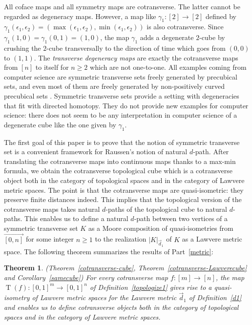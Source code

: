 \documentclass[a4paper,12pt]{amsart}
\renewcommand{\vec}{\overrightarrow}
\newtheorem*{thmN}{Theorem}
\theoremstyle{definition}
\renewcommand{\geq}{\geqslant}
\newcommand{\vd}{\vec{d}\!_1}
\DeclareMathOperator{\TT}{T}
\begin{document}
All coface maps and all symmetry maps are cotransverse. The latter cannot be regarded as degeneracy maps. However, a map like $\gamma_1:[2] \rightarrow [2]$ defined by $\gamma_1(\epsilon_1,\epsilon_2) = (\max(\epsilon_1,\epsilon_2),\min(\epsilon_1,\epsilon_2))$ is also cotransverse. Since $\gamma_1(1,0) = \gamma_1(0,1) = (1,0)$, the map $\gamma_1$ adds a degenerate $2$-cube by crushing the $2$-cube transversally to the direction of time which goes from $(0,0)$ to $(1,1)$. The \textit{transverse degeneracy maps} are exactly the cotransverse maps from $[n]$ to itself for $n\geq 2$ which are not one-to-one. All examples coming from computer science are symmetric transverse sets freely generated by precubical sets, and even most of them are freely generated by non-positively curved precubical sets \cite[Proposition~1.29]{zbMATH07226006}. Symmetric transverse sets provide a setting with degeneracies that fit with directed homotopy. They do not provide new examples for computer science: there does not seem to be any interpretation in computer science of a degenerate cube like the one given by $\gamma_1$.

The first goal of this paper is to prove that the notion of symmetric transverse set is a convenient framework for Raussen's notion of natural $d$-path. After translating the cotransverse maps into continuous maps thanks to a max-min formula, we obtain the cotransverse topological cube which is a cotransverse object both in the category of topological spaces and in the category of Lawvere metric spaces. The point is that the cotransverse maps are quasi-isometric: they preserve finite distances indeed. This implies that the topological version of the cotransverse maps takes natural $d$-paths of the topological cube to natural $d$-paths. This enables us to define a natural $d$-path between two vertices of a symmetric transverse set $K$ as a Moore composition of quasi-isometries from $\vec{[0,n]}$ for some integer $n\geq 1$ to the realization $|K|_{\vd}$ of $K$ as a Lawvere metric space. The following theorem summarizes the results of Part~\ref{metric}: 

\begin{thmN} (Theorem~\ref{cotransverse-cube}, Theorem~\ref{cotransverse-Lawverecube} and Corollary~\ref{samecube})
	For every cotransverse map $f:[m]\to [n]$, the map $\TT(f):[0,1]^m\to [0,1]^n$ of Definition~\ref{topologize1} gives rise to a quasi-isometry of Lawvere metric spaces for the Lawvere metric $\vd$ of Definition~\ref{d1} and enables us to define cotransverse objects both in the category of topological spaces and in the category of Lawvere metric spaces.
\end{thmN}
\end{document}
